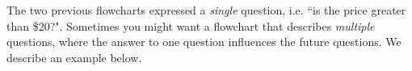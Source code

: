 


The two previous flowcharts expressed a \emph{single} question, i.e. ``is the price greater than \$20?". Sometimes you might want a flowchart that describes \emph{multiple} questions, where the answer to one question influences the future questions. We describe an example below.

